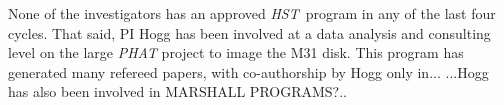 \documentclass[12pt]{article}
\newcommand{\project}[1]{\textsl{#1}}
\newcommand{\HST}{\project{HST}}
\begin{document}
None of the investigators has an approved \HST\ program in any of the
last four cycles.  That said, PI Hogg has been involved at a data
analysis and consulting level on the large \project{PHAT} project to
image the M31 disk.  This program has generated many refereed papers,
with co-authorship by Hogg only in...  ...Hogg has also been involved
in MARSHALL PROGRAMS?..



\end{document}
